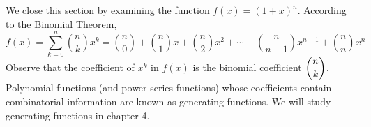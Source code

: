 \documentclass[handout]{ximera}
\begin{document}
We close this section by examining the function $f(x) = (1+x)^n$. According to the Binomial Theorem,
\[
f(x) = \sum_{k=0}^n \binom{n}{k} x^k = \binom{n}{0} + \binom{n}{1}x + \binom{n}{2}x^2 + \cdots + \binom{n}{n-1}x^{n-1} + \binom{n}{n}x^n
\]
Observe that the coefficient of $x^k$ in $f(x)$ is the binomial coefficient $\displaystyle \binom{n}{k}$. 
Polynomial functions (and power series functions) whose coefficients contain combinatorial 
information are known as generating functions.  We will study generating functions in chapter 4.

\end{document}

